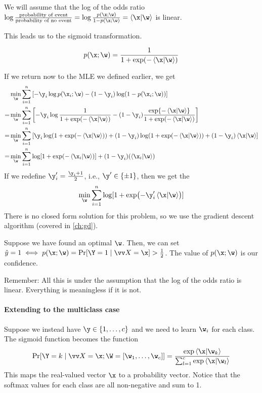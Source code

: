 \documentclass[class=cs480,notes,tikz]{agony}
\begin{document}
We will assume that the log of the odds ratio $\log\frac{\text{probability of event}}{\text{probability of no event}}
  = \log\frac{p(\x;\w)}{1-p(\x;\w)} = \ip{\x}{\w}$ is linear.

This leads us to the sigmoid transformation.
\begin{defn}
  \[p(\x;\w) = \frac{1}{1+\exp(-\ip{\x}{\w})}\]
\end{defn}

If we return now to the MLE we defined earlier, we get
\begin{align*}
    & \min_{\w}\sum_{i=1}^n\qty[-\y_i\log p(\x_i;\w)-(1-\y_i)\log(1-p(\x_i;\w))]                                                   \\
  = & \min_{\w}\sum_{i=1}^n\qty[-\y_i\log \frac{1}{1+\exp(-\ip{\x}{\w})} -(1-\y_i)\frac{\exp{-\ip{\x}{\w}}}{1+\exp(-\ip{\x}{\w})}] \\
  = & \min_{\w}\sum_{i=1}^n\qty[\y_i\log(1+\exp(-\ip{\x}{\w}))+(1-\y_i)\log(1+\exp(-\ip{\x}{\w})) + (1-\y_i)\ip{\x}{\w}]           \\
  = & \min_{\w}\sum_{i=1}^n \log[1+\exp(-\ip{\x_i}{\w})] + (1-\y_i)(\ip{\x_i}{\w})
\end{align*}
If we redefine $\y'_i = \frac{\y_i+1}{2}$, i.e., $\y' \in \{\pm1\}$,
then we get the 
\begin{equation}\label{eq:lgr}
  \min_{\w} \sum_{i=1}^n \log[1+\exp(-\y'_i\ip{\x}{\w})]
\end{equation}
There is no closed form solution for this problem,
so we use the gradient descent algorithm (covered in \cref{ch:gd}).

Suppose we have found an optimal $\w$.
Then, we can set $\hat y = 1 \iff p(\x;\w) = \Pr[\Y=1\mid\vv X=\x] > \frac12$.
The value of $p(\x;\w)$ is our confidence.

Remember: All this is under the assumption that the log of the odds ratio is linear.
Everything is meaningless if it is not.

\paragraph{Extending to the multiclass case}
Suppose we instead have $\y \in \{1,\dotsc,c\}$ and we need to learn $\w_i$ for each class.
The sigmoid function becomes the  function
\begin{equation}\label{eq:softmax}
  \Pr[\Y = k \mid \vv X = \x; \W = [\w_1,\dotsc,\w_c]]
  = \frac{\exp\ip{\x}{\w_k}}{\sum_{l=1}^c\exp\ip{\x}{\w_l}}
\end{equation}
This maps the real-valued vector $\x$ to a probability vector.
Notice that the softmax values for each class are all non-negative and sum to 1.
\end{document}
